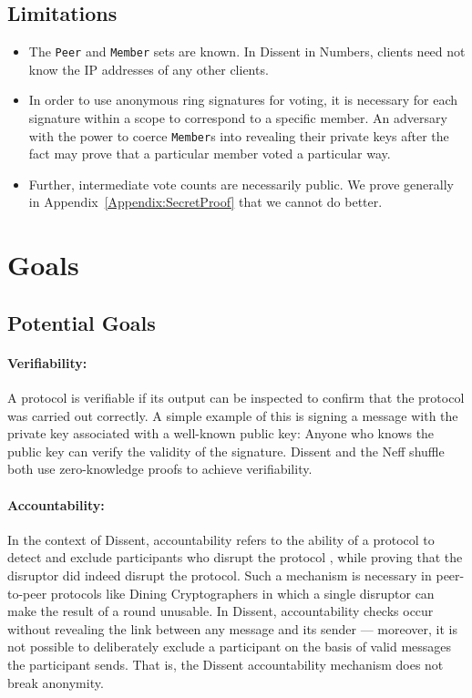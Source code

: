 \subsection{Limitations}
\begin{itemize}
  \item The \texttt{Peer} and \texttt{Member} sets are known. In Dissent in
    Numbers, clients need not know the IP addresses of any other clients.
  \item In order to use anonymous ring signatures for voting, it is necessary
    for each signature within a scope to correspond to a specific member. An
    adversary with the power to coerce \texttt{Member}s into revealing their
    private keys after the fact may prove that a particular member voted a
    particular way.
  \item Further, intermediate vote counts are necessarily public. We prove
    generally in Appendix~\ref{Appendix:SecretProof} that we cannot do better.
\end{itemize}

\section{Goals}
  \subsection{Potential Goals}
    \paragraph{Verifiability:} A protocol is verifiable if its output can be
    inspected to confirm that the protocol was carried out correctly. A simple
    example of this is signing a message with the private key associated with a
    well-known public key: Anyone who knows the public key can verify the
    validity of the signature. Dissent \cite{corrigan-gibbs_proactively_2013}
    and the Neff shuffle \cite{neff_verifiable_2001} both use zero-knowledge
    proofs to achieve verifiability.
    \paragraph{Accountability:} In the context of Dissent, accountability refers
    to the ability of a protocol to detect and exclude participants who disrupt
    the protocol \cite{syta_security_2014}, while proving that the disruptor did
    indeed disrupt the protocol. Such a mechanism is necessary in peer-to-peer
    protocols like Dining Cryptographers in which a single disruptor can make
    the result of a round unusable. In Dissent, accountability checks occur
    without revealing the link between any message and its sender --- moreover,
    it is not possible to deliberately exclude a participant on the basis of
    valid messages the participant sends. That is, the Dissent accountability
    mechanism does not break anonymity.
